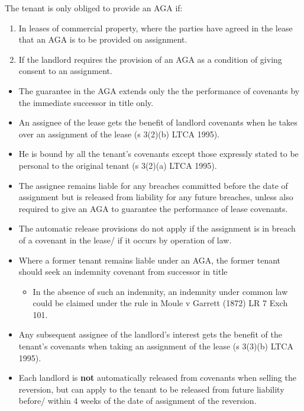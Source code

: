 \documentclass[
]{article}
\providecommand{\tightlist}{%
  \setlength{\itemsep}{0pt}\setlength{\parskip}{0pt}}
\begin{document}
The tenant is only obliged to provide an AGA if:

\begin{enumerate}
\tightlist
\item
  In leases of commercial property, where the parties have agreed in the
  lease that an AGA is to be provided on assignment.
\item
  If the landlord requires the provision of an AGA as a condition of
  giving consent to an assignment.
\end{enumerate}

\begin{itemize}
\tightlist
\item
  The guarantee in the AGA extends only the the performance of covenants
  by the immediate successor in title only.
\item
  An assignee of the lease gets the benefit of landlord covenants when
  he takes over an assignment of the lease (s 3(2)(b) LTCA 1995).
\item
  He is bound by all the tenant's covenants except those expressly
  stated to be personal to the original tenant (s 3(2)(a) LTCA 1995).
\item
  The assignee remains liable for any breaches committed before the date
  of assignment but is released from liability for any future breaches,
  unless also required to give an AGA to guarantee the performance of
  lease covenants.
\item
  The automatic release provisions do not apply if the assignment is in
  breach of a covenant in the lease/ if it occurs by operation of law.
\item
  Where a former tenant remains liable under an AGA, the former tenant
  should seek an indemnity covenant from successor in title

  \begin{itemize}
  \tightlist
  \item
    In the absence of such an indemnity, an indemnity under common law
    could be claimed under the rule in Moule v Garrett (1872) LR 7 Exch
    101.
  \end{itemize}
\item
  Any subsequent assignee of the landlord's interest gets the benefit of
  the tenant's covenants when taking an assignment of the lease (s
  3(3)(b) LTCA 1995).
\item
  Each landlord is \textbf{not} automatically released from covenants
  when selling the reversion, but can apply to the tenant to be released
  from future liability before/ within 4 weeks of the date of assignment
  of the reversion.
\end{itemize}
\end{document}
